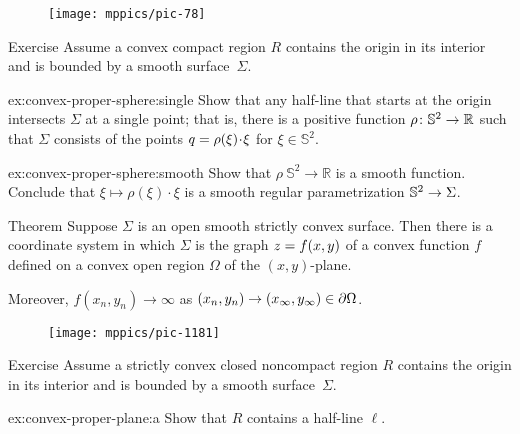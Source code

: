 {

\begin{wrapfigure}{r}{33 mm}
\vskip-0mm
\centering
\texttt{[image: mppics/pic-78]}
\end{wrapfigure}

\begin{thm}{Exercise}\label{ex:convex-proper-sphere}
Assume a convex compact region $R$ contains the origin in its interior and is bounded by a smooth surface~$\Sigma$.

\begin{subthm}{ex:convex-proper-sphere:single}
Show that any half-line that starts at the origin intersects $\Sigma$ at a single point;
that is, there is a positive function $\rho\:\mathbb{S}^2\z\to\mathbb{R}$ such that $\Sigma$ consists of the points $q\z=\rho(\xi)\cdot \xi$ for $\xi\in \mathbb{S}^2$.
\end{subthm}

\begin{subthm}{ex:convex-proper-sphere:smooth}
Show that $\rho\:\mathbb{S}^2\to\mathbb{R}$ is a smooth function.
Conclude that $\xi\mapsto \rho(\xi)\cdot \xi$ is a smooth regular parametrization $\mathbb{S}^2\z\to \Sigma$.
\end{subthm}

\end{thm}

\begin{thm}{Theorem}\label{thm:convex-open}
Suppose $\Sigma$ is an open smooth strictly convex surface.
Then there is a coordinate system in which $\Sigma$ is the graph $z\z=f(x,y)$ of a convex function $f$ defined on a convex open region $\Omega$ of the $(x,y)$-plane.

Moreover, $f(x_n,y_n)\to\infty$ as $(x_n,y_n)\to(x_\infty,y_\infty)\z\in \partial\Omega$.

\end{thm}

\begin{wrapfigure}{r}{33 mm}
\vskip-8mm
\centering
\texttt{[image: mppics/pic-1181]}
\end{wrapfigure}


\begin{thm}{Exercise}\label{ex:convex-proper-plane}
Assume a strictly convex closed noncompact region $R$ contains the origin in its interior and is bounded by a smooth surface~$\Sigma$.

\begin{subthm}{ex:convex-proper-plane:a}
Show that $R$ contains a half-line $\ell$.
\end{subthm}


\end{thm}}
